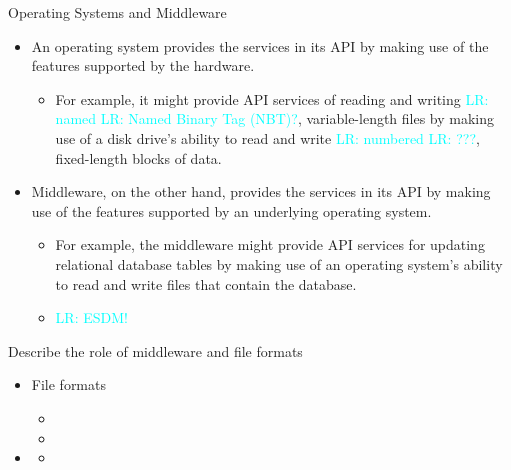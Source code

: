 \documentclass[compress,11pt,xcolor=svgnames,aspectratio=169]{beamer}
\newcommand{\lr}[1]{\textcolor{cyan}{LR: #1}}
\begin{document}
\begin{frame}[fragile]{Operating Systems and Middleware}

\begin{itemize}
\setlength\itemsep{0.6cm}

  \item An operating system provides the services in its API by making use of the features supported by the hardware.

    \begin{itemize}
    \setlength\itemsep{0.4cm}
        \item For example, it might provide API services of reading and writing \lr{named} \lr{Named Binary Tag (NBT)?}, variable-length files by making use of a disk drive's ability to read and write \lr{numbered} \lr{???}, fixed-length blocks of data.
    \end{itemize}

  \item Middleware, on the other hand, provides the services in its API by making use of the features supported by an underlying operating system.

    \begin{itemize}
    \setlength\itemsep{0.4cm}
        \item For example, the middleware might provide API services for updating relational database tables by making use of an operating system's ability to read and write files that contain the database.
        \item \lr{ESDM!}
    \end{itemize}

\end{itemize}

\nocite{hailperin2006operating}

\end{frame}

\begin{frame}[fragile]{Describe the role of middleware and file formats}

\begin{itemize}

  \item File formats
    \begin{itemize}
        \item
        \item
    \end{itemize}

  \item
    \begin{itemize}
      \item
    \end{itemize}

\end{itemize}

\end{frame}
\end{document}
